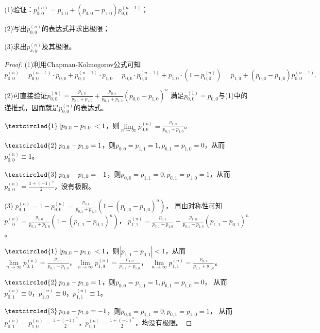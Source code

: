 \begin{enumerate}
    (1)验证：$p_{0,0}^{(n)}=p_{1,0}+(p_{0,0}-p_{1,0})p_{0,0}^{(n-1)}$；

    (2)写出$p_{0,0}^{(n)}$的表达式并求出极限；

    (3)求出$p_{x,y}^{(n)}$及其极限。
    \begin{proof}
        (1)利用Chapman-Kolmogorov公式可知\[p_{0,0}^{(n)}=p_{0,0}^{(n-1)}\cdot p_{0,0}+p_{0,1}^{(n-1)}\cdot p_{1,0}
        =p_{0,0}\cdot p_{0,0}^{(n-1)}+p_{1,0}\cdot(1-p_{0,0}^{(n)})=p_{1,0}+(p_{0,0}-p_{1,0})p_{0,0}^{(n-1)}.\]

        (2)可直接验证$p_{0,0}^{(n)}=\frac{p_{1,0}}{p_{0,1}+p_{1,0}}+\frac{p_{0,1}}{p_{0,1}+p_{1,0}}(p_{0,0}-p_{1,0})^n$
        满足$p_{0,0}^{(1)}=p_{0,0}$与(1)中的递推式，因而就是$p_{0,0}^{(n)}$的表达式。

        $\textcircled{1}\:|p_{0,0}-p_{1,0}|<1$，则$\lim\limits_{n\to\infty}p_{0,0}^{(n)}=\frac{p_{1,0}}{p_{0,1}+p_{1,0}}$。

        $\textcircled{2}\:p_{0,0}-p_{1,0}=1$，则$p_{0,0}=p_{1,1}=1,p_{0,1}=p_{1,0}=0$，从而$p_{0,0}^{(n)}\equiv1$。

        $\textcircled{3}\:p_{0,0}-p_{1,0}=-1$，则$p_{0,0}=p_{1,1}=0,p_{0,1}=p_{1,0}=1$，从而$p_{0,0}^{(n)}=\frac{1+(-1)^n}{2}$，没有极限。

        (3) $p_{0,1}^{(n)}=1-p_{0,0}^{(n)}=\frac{p_{0,1}}{p_{0,1}+p_{1,0}}(1-(p_{0,0}-p_{1,0})^n)$，
        再由对称性可知$p_{1,0}^{(n)}=\frac{p_{1,0}}{p_{0,1}+p_{1,0}}(1-(p_{1,1}-p_{0,1})^n)$，
        $p_{1,1}^{(n)}=\frac{p_{0,1}}{p_{0,1}+p_{1,0}}+\frac{p_{1,0}}{p_{0,1}+p_{1,0}}(p_{1,1}-p_{0,1})^n$。

        $\textcircled{1}\:|p_{0,0}-p_{1,0}|<1$，则$|p_{1,1}-p_{0,1}|<1$，从而$\lim\limits_{n\to\infty}p_{0,1}^{(n)}
        =\frac{p_{0,1}}{p_{0,1}+p_{1,0}}$，$\lim\limits_{n\to\infty}p_{1,0}^{(n)}=\frac{p_{1,0}}{p_{0,1}+p_{1,0}}$，
        $\lim\limits_{n\to\infty}p_{1,1}^{(n)}=\frac{p_{0,1}}{p_{0,1}+p_{1,0}}$。

        $\textcircled{2}\:p_{0,0}-p_{1,0}=1$，则$p_{0,0}=p_{1,1}=1,p_{0,1}=p_{1,0}=0$，
        从而$p_{0,1}^{(n)}\equiv0$，$p_{1,0}^{(n)}\equiv0$，$p_{1,1}^{(n)}\equiv1$。

        $\textcircled{3}\:p_{0,0}-p_{1,0}=-1$，则$p_{0,0}=p_{1,1}=0,p_{0,1}=p_{1,0}=1$，
        从而$p_{0,1}^{(n)}=p_{1,0}^{(n)}=\frac{1-(-1)^n}{2}$，$p_{1,1}^{(n)}=\frac{1+(-1)^n}{2}$，均没有极限。
    \end{proof}
\end{enumerate}


